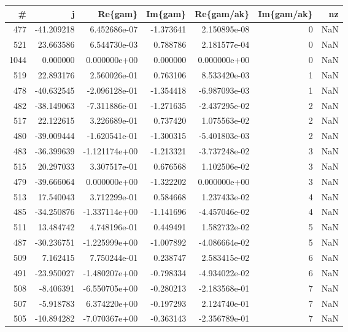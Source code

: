 \begin{tabular}{rrrrrrr}
\toprule
   \# &          j &       Re\{gam\} &   Im\{gam\} &    Re\{gam/ak\} &  Im\{gam/ak\} &  nz \\
\midrule
 477 & -41.209218 &  6.452686e-07 & -1.373641 &  2.150895e-08 &           0 & NaN \\
 521 &  23.663586 &  6.544730e-03 &  0.788786 &  2.181577e-04 &           0 & NaN \\
1044 &   0.000000 &  0.000000e+00 &  0.000000 &  0.000000e+00 &           0 & NaN \\
 519 &  22.893176 &  2.560026e-01 &  0.763106 &  8.533420e-03 &           1 & NaN \\
 478 & -40.632545 & -2.096128e-01 & -1.354418 & -6.987093e-03 &           1 & NaN \\
 482 & -38.149063 & -7.311886e-01 & -1.271635 & -2.437295e-02 &           2 & NaN \\
 517 &  22.122615 &  3.226689e-01 &  0.737420 &  1.075563e-02 &           2 & NaN \\
 480 & -39.009444 & -1.620541e-01 & -1.300315 & -5.401803e-03 &           2 & NaN \\
 483 & -36.399639 & -1.121174e+00 & -1.213321 & -3.737248e-02 &           3 & NaN \\
 515 &  20.297033 &  3.307517e-01 &  0.676568 &  1.102506e-02 &           3 & NaN \\
 479 & -39.666064 &  0.000000e+00 & -1.322202 &  0.000000e+00 &           3 & NaN \\
 513 &  17.540043 &  3.712299e-01 &  0.584668 &  1.237433e-02 &           4 & NaN \\
 485 & -34.250876 & -1.337114e+00 & -1.141696 & -4.457046e-02 &           4 & NaN \\
 511 &  13.484742 &  4.748196e-01 &  0.449491 &  1.582732e-02 &           5 & NaN \\
 487 & -30.236751 & -1.225999e+00 & -1.007892 & -4.086664e-02 &           5 & NaN \\
 509 &   7.162415 &  7.750244e-01 &  0.238747 &  2.583415e-02 &           6 & NaN \\
 491 & -23.950027 & -1.480207e+00 & -0.798334 & -4.934022e-02 &           6 & NaN \\
 508 &  -8.406391 & -6.550705e+00 & -0.280213 & -2.183568e-01 &           7 & NaN \\
 507 &  -5.918783 &  6.374220e+00 & -0.197293 &  2.124740e-01 &           7 & NaN \\
 505 & -10.894282 & -7.070367e+00 & -0.363143 & -2.356789e-01 &           7 & NaN \\

\end{tabular}
